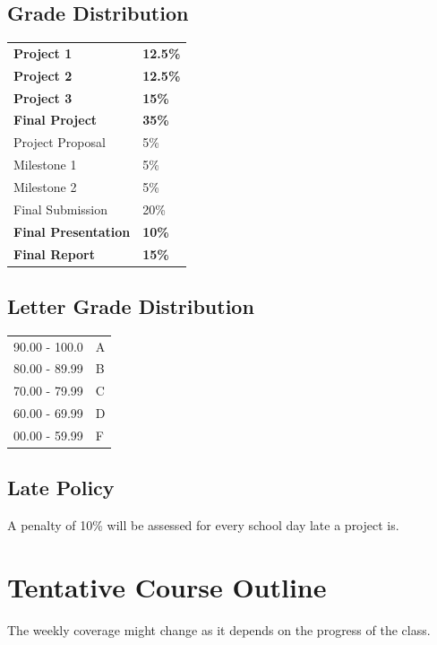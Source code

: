 \documentclass[11pt]{article}
\newcommand\tab[1][.5in]{\hspace*{#1}}
\begin{document}
\subsection{Grade Distribution}
\begin{tabular}{ll}
    \textbf{Project 1} & \textbf{12.5\%} \\
    \textbf{Project 2} & \textbf{12.5\%} \\
    \textbf{Project 3} & \textbf{15\%} \\
    \textbf{Final Project} & \textbf{35\%} \\
    \tab Project Proposal & 5\% \\
    \tab Milestone 1 & 5\% \\
    \tab Milestone 2 & 5\% \\
    \tab Final Submission & 20\% \\
    \textbf{Final Presentation} & \textbf{10\%} \\
    \textbf{Final Report} & \textbf{15\%} \\
\end{tabular}

\subsection{Letter Grade Distribution}
\begin{tabular}{ll}
    90.00 - 100.0 & A \\
    80.00 - 89.99 & B \\
    70.00 - 79.99 & C \\
    60.00 - 69.99 & D \\
    00.00 - 59.99 & F
\end{tabular}

\subsection{Late Policy}
A penalty of 10\% will be assessed for every school day late a project is.

\newpage

\section{Tentative Course Outline}

The weekly coverage might change as it depends on the progress of the class.
\end{document}
